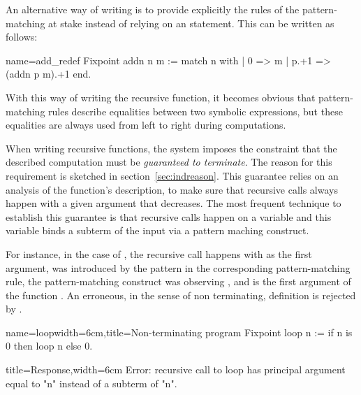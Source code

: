 An alternative way of writing  is to provide explicitly the
rules of the pattern-matching at stake instead of relying on an 
statement. This can be written as follows:

\begin{coq}{name=add_redef}{}
Fixpoint addn n m :=
  match n with
  | 0 => m
  | p.+1 => (addn p m).+1
  end.
\end{coq}
With this way of writing the recursive function, it becomes obvious that
pattern-matching rules describe equalities between two symbolic
expressions, but these equalities are always used from left to right during
computations.

When writing recursive functions, the \Coq{} system imposes the
constraint that the described computation must be \emph{guaranteed to
terminate}.  The reason for this requirement is sketched in
section~\ref{sec:indreason}.
This guarantee relies on an analysis of the function's
description, to make sure that recursive calls always happen with a
given argument that decreases.  The most frequent technique to
establish this guarantee is that recursive calls happen on a variable
and this variable binds a subterm of the input via a pattern maching
construct.

For instance, in the case of , the recursive call happens
with  as the first argument,  was introduced by the pattern 
in the corresponding pattern-matching rule, the pattern-matching
construct was observing , and  is the first argument of the
function .  An erroneous, in the sense of non terminating,
definition is rejected by \Coq{}.

\begin{coq}{name=loop}{width=6cm,title=Non-terminating program}
Fixpoint loop n :=
 if n is 0 then loop n else 0.
$~$
\end{coq}
\begin{coqout}{}{title=Response,width=6cm}
Error: recursive call to loop has
principal argument equal to  "n"
instead of a subterm of "n".
\end{coqout}

